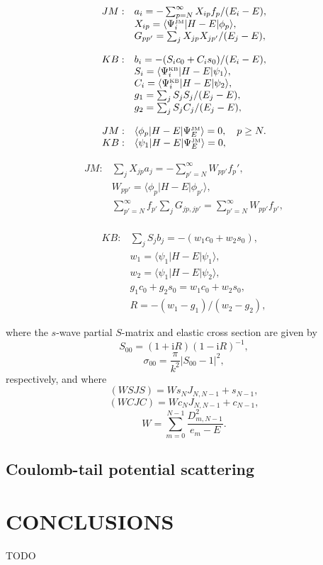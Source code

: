 \documentclass[aip
, pra
, showpacs
, aps
, twocolumn
, groupedaddress
, floatfix
]{revtex4}
\newcommand{\beq}{\begin{equation}}
\newcommand{\eeq}{\end{equation}}
\newcommand{\barr}{\begin{array}}
\newcommand{\earr}{\end{array}}
\newcommand{\JM}{\mbox{\tiny{JM}}}
\newcommand{\KB}{\mbox{\tiny{KB}}}
\begin{document}
\beq \barr{rl}
JM: & a_i = - \sum_{p=N}^{\infty} X_{ip} f_p / (E_i-E),\\
& X_{ip}=  \langle\Psi_i^{\JM}|H-E| \phi_p \rangle ,\\
& G_{pp'}= \sum_j X_{jp} X_{jp'}/(E_j-E),
\earr \eeq

\beq \barr{rl}
KB: & b_i = - (S_i c_0 + C_i s_0) / (E_i-E), \\
& S_i = \langle\Psi_i^{\KB}|H-E|  \psi_1 \rangle ,\\
& C_i = \langle\Psi_i^{\KB}|H-E|  \psi_2 \rangle ,\\
& g_1= \sum_j S_{j} S_{j}/(E_j-E),\\
& g_2= \sum_j S_{j} C_{j}/(E_j-E),
\earr \eeq

\beq \barr{rl}
JM: & \langle\phi_p|H-E|\Psi_E^{\JM}\rangle=0 , \ \ \ p \geq N.\\
KB: & \langle \psi_1 |H-E|\Psi_E^{\JM}\rangle=0,
\earr \eeq

\beq \barr{rl}
JM: & \sum_j X_{jp} a_j = - \sum_{p'=N}^{\infty} W_{pp'} f_p',\\
& W_{pp'}  = \langle \phi_p | H-E | \phi_{p'} \rangle,\\
& \sum_{p'=N}^{\infty} f_{p'}  \sum_j G_{jp,jp'} = \sum_{p'=N}^{\infty} W_{pp'} f_{p'},\\
\earr \eeq

\beq \barr{rl}
KB: & \sum_j S_{j} b_j = - (w_1 c_0 +  w_2 s_0), \\
 & w_1  = \langle \psi_1 |H-E| \psi_1 \rangle,\\
 & w_2 = \langle \psi_1 |H-E| \psi_2 \rangle,\\
 & g_1 c_0 + g_2 s_0 = w_1 c_0 +  w_2 s_0,\\
 & R = -(w_1 - g_1) / (w_2 - g_2),
\earr \eeq

where the $s$-wave partial $S$-matrix and elastic cross section are given by
\beq
S_{00}=(1+\mbox{i}R)(1-\mbox{i}R)^{-1},
\eeq
\beq
\sigma_{00}=\frac{\pi}{k^2} |S_{00}-1|^2,
\eeq
respectively, and where
\beq
(WSJS) = W s_N J_{N,N-1} + s_{N-1},
\eeq
\beq
(WCJC) = W c_N J_{N,N-1} + c_{N-1},
\eeq
\beq
W= \sum_{m=0}^{N-1} \frac{D_{m,N-1}^2}{e_m-E}.
\label{g}
\eeq

\subsection{Coulomb-tail potential scattering}



\section{CONCLUSIONS}
TODO


\begin{acknowledgments}
\end{acknowledgments}





%
\end{document}
